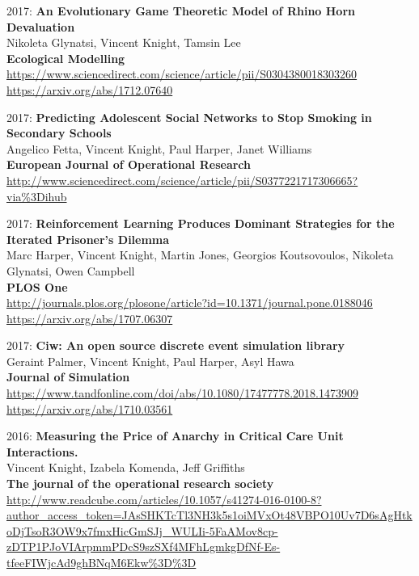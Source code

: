 \documentclass[10pt]{res} %
\begin{document}
\begin{resume}
\begin{etaremune}
\item
2017: \textbf{An Evolutionary Game Theoretic Model of Rhino Horn Devaluation}\\
Nikoleta Glynatsi, Vincent Knight, Tamsin Lee
\\
\textbf{Ecological Modelling}
\\
\url{https://www.sciencedirect.com/science/article/pii/S0304380018303260}
\\
\url{https://arxiv.org/abs/1712.07640}
\\

\item
2017: \textbf{Predicting Adolescent Social Networks to Stop Smoking in Secondary Schools}\\
Angelico Fetta, Vincent Knight, Paul Harper, Janet Williams
\\
\textbf{European Journal of Operational Research}
\\
\url{http://www.sciencedirect.com/science/article/pii/S0377221717306665?via%3Dihub}
\\

\item
2017: \textbf{Reinforcement Learning Produces Dominant Strategies for the Iterated Prisoner's Dilemma}\\
Marc Harper, Vincent Knight, Martin Jones, Georgios Koutsovoulos, Nikoleta Glynatsi, Owen Campbell
\\
\textbf{PLOS One}
\\
\url{http://journals.plos.org/plosone/article?id=10.1371/journal.pone.0188046}
\\
\url{https://arxiv.org/abs/1707.06307}
\\

\item
2017: \textbf{Ciw: An open source discrete event simulation library}\\
Geraint Palmer, Vincent Knight, Paul Harper, Asyl Hawa
\\
\textbf{Journal of Simulation}
\\
\url{https://www.tandfonline.com/doi/abs/10.1080/17477778.2018.1473909}
\\
\url{https://arxiv.org/abs/1710.03561}
\\

\item
2016: \textbf{Measuring the Price of Anarchy in Critical Care Unit Interactions.}\\
Vincent Knight, Izabela Komenda, Jeff Griffiths
\\
\textbf{The journal of the operational research society}
\\
\url{http://www.readcube.com/articles/10.1057/s41274-016-0100-8?author_access_token=JAsSHKTcTl3NH3k5s1oiMVxOt48VBPO10Uv7D6sAgHtkoDjTsoR3OW9x7fmxHicGmSJj_WULIi-5FaAMov8cp-zDTP1PJoVIArpmmPDcS9szSXf4MFhLgmkgDfNf-Es-tfeeFIWjcAd9ghBNqM6Ekw%3D%3D}
\\


\end{etaremune}
\end{resume}
\end{document}
